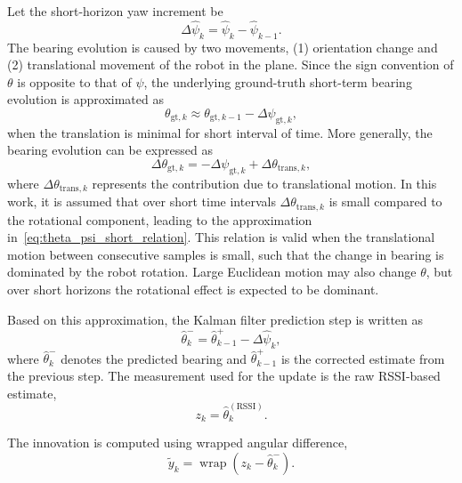 \documentclass[subscriptcorrection,upint,varvw,barcolor=Goldenrod3,mathalfa=cal=euler,balance,hyphenate,pdf-a]{asmejour}
\begin{document}
Let the short-horizon yaw increment be
\begin{equation}
\Delta \hat{\psi}_k = \hat{\psi}_k - \hat{\psi}_{k-1}.
\end{equation}
The bearing evolution is caused by two movements, (1) orientation change and (2) translational movement of the robot in the plane. Since the sign convention of \(\theta\) is opposite to that of \(\psi\), the underlying ground-truth short-term bearing evolution is approximated as
\begin{equation}
\theta_{\mathrm{gt},k} \approx \theta_{\mathrm{gt},k-1} - \Delta \psi_{\mathrm{gt},k},
\label{eq:theta_psi_short_relation}
\end{equation}
when the translation is minimal for short interval of time. More generally, the bearing evolution can be expressed as
\begin{equation}
\Delta \theta_{\mathrm{gt},k} = -\Delta \psi_{\mathrm{gt},k} + \Delta \theta_{\mathrm{trans},k},
\end{equation}
where $\Delta \theta_{\mathrm{trans},k}$ represents the contribution due to translational motion. In this work, it is assumed that over short time intervals $\Delta \theta_{\mathrm{trans},k}$ is small compared to the rotational component, leading to the approximation in~\eqref{eq:theta_psi_short_relation}.
This relation is valid when the translational motion between consecutive samples is small, such that the change in bearing is dominated by the robot rotation. Large Euclidean motion may also change \(\theta\), but over short horizons the rotational effect is expected to be dominant.

Based on this approximation, the Kalman filter prediction step is written as
\begin{equation}
\hat{\theta}_k^{-} = \hat{\theta}_{k-1}^{+} - \Delta \hat{\psi}_k,
\end{equation}
where \(\hat{\theta}_k^{-}\) denotes the predicted bearing and \(\hat{\theta}_{k-1}^{+}\) is the corrected estimate from the previous step. The measurement used for the update is the raw RSSI-based estimate,
\begin{equation}
z_k = \hat{\theta}_k^{(\mathrm{RSSI})}.
\end{equation}

The innovation is computed using wrapped angular difference,
\begin{equation}
\tilde{y}_k = \operatorname{wrap}\!\left(z_k - \hat{\theta}_k^{-}\right).
\end{equation}
\end{document}
